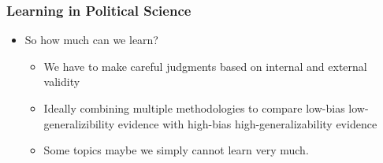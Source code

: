 \documentclass[xcolor=x11names,compress]{beamer}\usepackage[]{graphicx}\usepackage[]{color}
\renewcommand{\(}{\begin{columns}}
\renewcommand{\)}{\end{columns}}
\newcommand{\<}[1]{\begin{column}{#1}}
\renewcommand{\>}{\end{column}}
\begin{document}
\begin{frame}
\frametitle{Learning in Political Science}
\begin{itemize}
\item So how much can we learn?
\pause
\begin{itemize}
\item We have to make careful judgments based on internal and external validity
\pause
\item Ideally combining multiple methodologies to compare low-bias low-generalizibility evidence with high-bias high-generalizability evidence
\pause
\item Some topics maybe we simply cannot learn very much.
\end{itemize}
\end{itemize}
\end{frame} 
\end{document}
